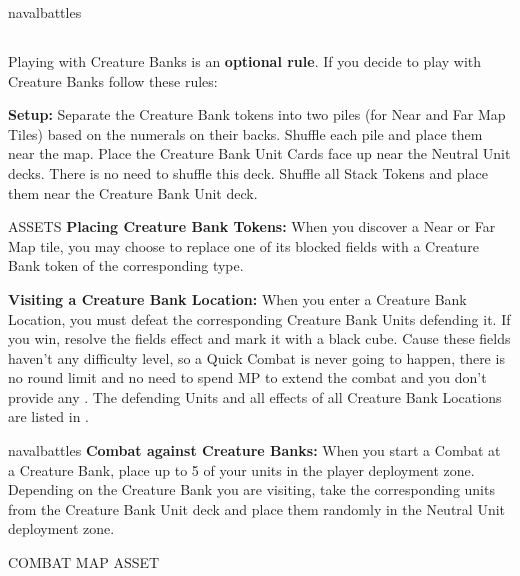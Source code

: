 \begin{multicols*}{2}
\vspace*{\fill}

\begin{expansion}{navalbattles}
  \subsection*{}
  Playing with Creature Banks is an \textbf{optional rule}. If you decide to play with Creature Banks follow these rules:\par
  \vspace*{1em}
  \textbf{Setup:} Separate the Creature Bank tokens into two piles (for Near and Far Map Tiles) based on the numerals on their backs. Shuffle each pile and place them near the map.
  Place the Creature Bank Unit Cards face up near the Neutral Unit decks. There is no need to shuffle this deck. Shuffle all Stack Tokens and place them near the Creature Bank Unit deck.
  \vspace*{1em}

  ASSETS %
  \textbf{Placing Creature Bank Tokens:} When you discover a Near or Far Map tile, you may choose to replace one of its blocked fields with a Creature Bank token of the corresponding type.\par
  \vspace*{1em}
  \textbf{Visiting a Creature Bank Location:} When you enter a Creature Bank Location, you must defeat the corresponding Creature Bank Units defending it. If you win, resolve the fields effect and mark it with a black cube. Cause these fields haven't any difficulty level, so a Quick Combat is never going to happen, there is no round limit and no need to spend MP to extend the combat and you don't provide any . The defending Units and all effects of all Creature Bank Locations are listed in .
  \vspace*{1em}
  \end{expansion}
  \begin{expansion}{navalbattles}
  \textbf{Combat against Creature Banks:} When you start a Combat at a Creature Bank, place up to 5 of your units in the player deployment zone. Depending on the Creature Bank you are visiting, take the corresponding units from the Creature Bank Unit deck and place them randomly in the Neutral Unit deployment zone.

  COMBAT MAP ASSET


\end{expansion}
\end{multicols*}

